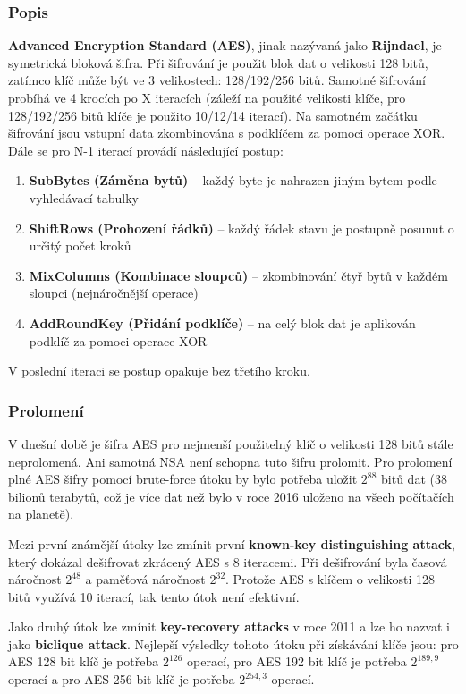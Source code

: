 \documentclass[12pt, a4paper]{article}
\begin{document}
		\subsubsection{Popis}
		\textbf{Advanced Encryption Standard (AES)}, jinak nazývaná jako \textbf{Rijndael}, je symetrická bloková šifra. Při šifrování je použit blok dat o velikosti 128 bitů, zatímco klíč může být ve 3 velikostech: 128/192/256 bitů. Samotné šifrování probíhá ve 4 krocích po X iteracích (záleží na použité velikosti klíče, pro 128/192/256 bitů klíče je použito 10/12/14 iterací). Na samotném začátku šifrování jsou vstupní data zkombinována s podklíčem za pomoci operace XOR. Dále se pro N-1 iterací provádí následující postup:
	\begin{enumerate}
	\item \textbf{SubBytes (Záměna bytů)} -- každý byte je nahrazen jiným bytem podle vyhledávací tabulky
	\item \textbf{ShiftRows (Prohození řádků)} -- každý řádek stavu je postupně posunut o určitý počet kroků
	\item \textbf{MixColumns (Kombinace sloupců)} -- zkombinování čtyř bytů v každém sloupci (nejnáročnější operace)
	\item \textbf{AddRoundKey (Přidání podklíče)} -- na celý blok dat je aplikován podklíč za pomoci operace XOR
	\end{enumerate}
	V poslední iteraci se postup opakuje bez třetího kroku.
		\subsubsection{Prolomení}
		V dnešní době je šifra AES pro nejmenší použitelný klíč o velikosti 128 bitů stále neprolomená. Ani samotná NSA není schopna tuto šifru prolomit. Pro prolomení plné AES šifry pomocí brute-force útoku by bylo potřeba uložit $2^{88}$ bitů dat (38 bilionů terabytů, což je více dat než bylo v roce 2016 uloženo na všech počítačích na planetě).
		\par Mezi první známější útoky lze zmínit první \textbf{known-key distinguishing attack}, který dokázal dešifrovat zkrácený AES s 8 iteracemi. Při dešifrování byla časová náročnost $2^{48}$ a paměťová náročnost $2^{32}$. Protože AES s klíčem o velikosti 128 bitů využívá 10 iterací, tak tento útok není efektivní.
		\par Jako druhý útok lze zmínit \textbf{key-recovery attacks} v roce 2011 a lze ho nazvat i jako \textbf{biclique attack}. Nejlepší výsledky tohoto útoku při získávání klíče jsou: pro AES 128 bit klíč je potřeba $2^{126}$ operací, pro AES 192 bit klíč je potřeba $2^{189,9}$ operací a pro AES 256 bit klíč je potřeba $2^{254,3}$  operací.
\end{document}
